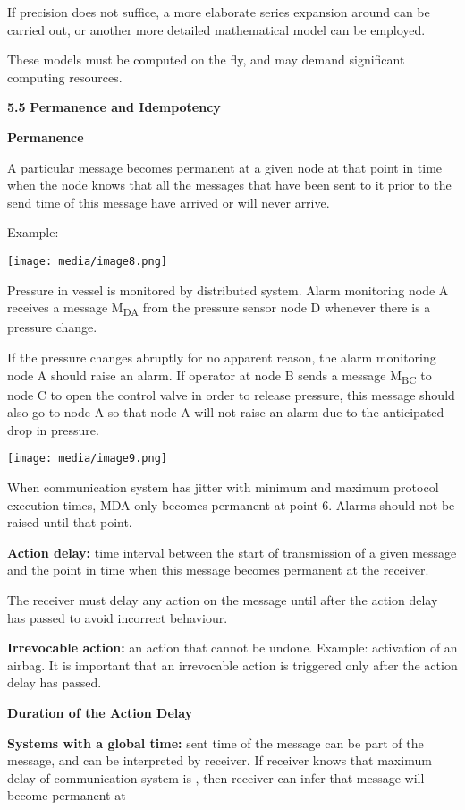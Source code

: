 If precision does not suffice, a more elaborate series expansion around
can be carried out, or another more detailed mathematical model can be
employed.

These models must be computed on the fly, and may demand significant
computing resources.

\textbf{5.5} \protect\hypertarget{teil6}{}{}\textbf{Permanence and
Idempotency}

\textbf{Permanence}

A particular message becomes permanent at a given node at that point in
time when the node knows that all the messages that have been sent to it
prior to the send time of this message have arrived or will never
arrive.

Example:

\texttt{[image: media/image8.png]}

Pressure in vessel is monitored by distributed system. Alarm monitoring
node A receives a message M\textsubscript{DA} from the pressure sensor
node D whenever there is a pressure change.

If the pressure changes abruptly for no apparent reason, the alarm
monitoring node A should raise an alarm. If operator at node B sends a
message M\textsubscript{BC} to node C to open the control valve in order
to release pressure, this message should also go to node A so that node
A will not raise an alarm due to the anticipated drop in pressure.

\texttt{[image: media/image9.png]}

When communication system has jitter with minimum and maximum protocol
execution times, MDA only becomes permanent at point 6. Alarms should
not be raised until that point.

\textbf{Action delay:} time interval between the start of transmission
of a given message and the point in time when this message becomes
permanent at the receiver.

The receiver must delay any action on the message until after the action
delay has passed to avoid incorrect behaviour.

\textbf{Irrevocable action:} an action that cannot be undone. Example:
activation of an airbag. It is important that an irrevocable action is
triggered only after the action delay has passed.

\textbf{Duration of the Action Delay}

\textbf{Systems with a global time:} sent time of the message can be
part of the message, and can be interpreted by receiver. If receiver
knows that maximum delay of communication system is , then receiver can
infer that message will become permanent at


